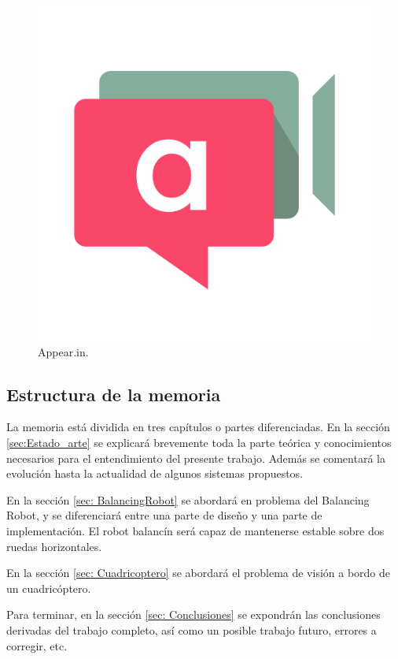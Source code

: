 \begin{figure}[H]
	\center
	\includegraphics[trim = 0mm 0mm 0mm 0mm, clip,scale=0.3]{imagenes/Introduction/appear}
	\caption{Appear.in.}
	\label{fig:appear}
\end{figure}

\subsection{Estructura de la memoria}

La memoria está dividida en tres capítulos o partes diferenciadas. \newline
En la sección \ref{sec:Estado_arte} se explicará brevemente toda la parte teórica y conocimientos necesarios para el entendimiento del presente trabajo. Además se comentará la evolución hasta la actualidad de algunos sistemas propuestos.\newline

En la sección \ref{sec: BalancingRobot} se abordará en problema del Balancing Robot, y se diferenciará entre una parte de diseño y una parte de implementación. El robot balancín será capaz de mantenerse estable sobre dos ruedas horizontales.\newline

En la sección \ref{sec: Cuadricoptero} se abordará el problema de visión a bordo de un cuadricóptero. \newline

Para terminar, en la sección \ref{sec: Conclusiones} se expondrán las conclusiones derivadas del trabajo completo, así como un posible trabajo futuro, errores a corregir, etc.   